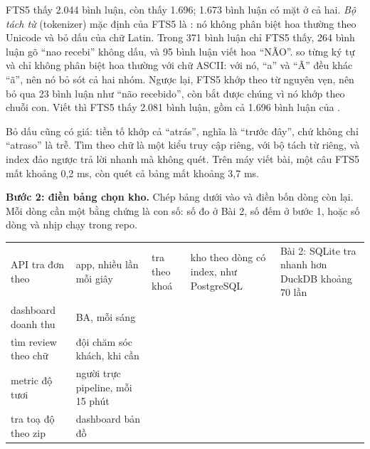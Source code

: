 FTS5 thấy 2.044 bình luận, còn  thấy 1.696; 1.673 bình luận có mặt ở cả hai. \textit{Bộ tách từ} (tokenizer) mặc định của FTS5 là : nó không phân biệt hoa thường theo Unicode và bỏ dấu của chữ Latin. Trong 371 bình luận chỉ FTS5 thấy, 264 bình luận gõ ``nao recebi'' không dấu, và 95 bình luận viết hoa ``NÃO''.  so từng ký tự và chỉ không phân biệt hoa thường với chữ ASCII: với nó, ``a'' và ``Ã'' đều khác ``ã'', nên nó bỏ sót cả hai nhóm. Ngược lại, FTS5 khớp theo từ nguyên vẹn, nên bỏ qua 23 bình luận như ``não recebido'', còn  bắt được chúng vì nó khớp theo chuỗi con. Viết  thì FTS5 thấy 2.081 bình luận, gồm cả 1.696 bình luận của .

Bỏ dấu cũng có giá: tiền tố  khớp cả ``atrás'', nghĩa là ``trước đây'', chứ không chỉ ``atraso'' là trễ. Tìm theo chữ là một kiểu truy cập riêng, với bộ tách từ riêng, và index đảo ngược trả lời nhanh mà không quét. Trên máy viết bài, một câu FTS5 mất khoảng 0,2 ms, còn  quét cả bảng mất khoảng 3,7 ms.

\textbf{Bước 2: điền bảng chọn kho.} Chép bảng dưới vào  và điền bốn dòng còn lại. Mỗi dòng cần một bằng chứng là con số: số đo ở Bài 2, số đếm ở bước 1, hoặc số dòng và nhịp chạy trong repo.

\begin{xltabular}{\textwidth}{@{}P{2.4cm} P{2.4cm} P{2.6cm} P{2.2cm} L@{}}
\toprule
{} &  &  &  &  \\
\midrule
\endhead
\bottomrule
\endfoot
API tra đơn theo  & app, nhiều lần mỗi giây & tra theo khoá & kho theo dòng có index, như PostgreSQL & Bài 2: SQLite tra nhanh hơn DuckDB khoảng 70 lần \\
dashboard doanh thu & BA, mỗi sáng & & & \\
tìm review theo chữ & đội chăm sóc khách, khi cần & & & \\
metric độ tươi & người trực pipeline, mỗi 15 phút & & & \\
tra toạ độ theo zip & dashboard bản đồ & & & \\
\end{xltabular}

